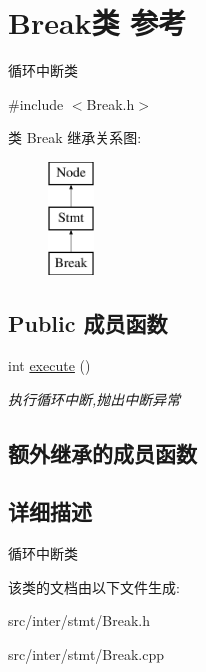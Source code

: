 \hypertarget{class_break}{}\section{Break类 参考}
\label{class_break}


循环中断类  




{\ttfamily \#include $<$Break.\+h$>$}

类 Break 继承关系图\+:\begin{figure}[H]
\begin{center}
\leavevmode
\includegraphics[height=3.000000cm]{class_break}
\end{center}
\end{figure}
\subsection*{Public 成员函数}
\begin{DoxyCompactItemize}
\item 
\mbox{\label{class_break_a554fd4cae05d203145d62868f73004d4}} 
int \hyperlink{class_break_a554fd4cae05d203145d62868f73004d4}{execute} ()
\begin{DoxyCompactList}\small\item\em 执行循环中断,抛出中断异常 \end{DoxyCompactList}\end{DoxyCompactItemize}
\subsection*{额外继承的成员函数}


\subsection{详细描述}
循环中断类 

该类的文档由以下文件生成\+:\begin{DoxyCompactItemize}
\item 
src/inter/stmt/Break.\+h\item 
src/inter/stmt/Break.\+cpp\end{DoxyCompactItemize}
